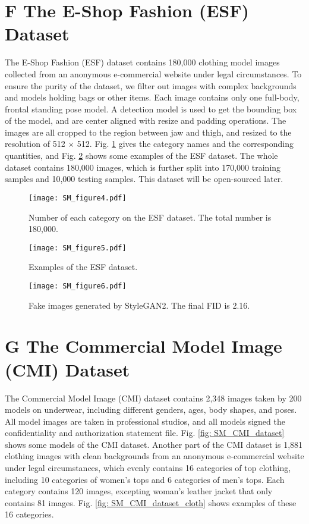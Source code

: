 \documentclass[10pt,twocolumn,letterpaper]{article}
\begin{document}
\section*{F The E-Shop Fashion (ESF) Dataset }
The E-Shop Fashion (ESF) dataset contains 180,000 clothing model images collected from an anonymous e-commercial website under legal circumstances. To ensure the purity of the dataset, we filter out images with complex backgrounds and models holding bags or other items. Each image contains only one full-body, frontal standing pose model.
A detection model is used to get the bounding box of the model, and are center aligned with resize and padding operations. The images are all cropped to the region between jaw and thigh, and resized to the resolution of 512 $\times$ 512. Fig. \ref{fig: SM_sta_cloth} gives the category names and the corresponding quantities, and Fig. \ref{fig: SM_ESF} shows some examples of the ESF dataset. The whole dataset contains 180,000 images, which is further split into 170,000 training samples and 10,000 testing samples. This dataset will be open-sourced later.

\begin{figure}[h]
  \centering
  \texttt{[image: SM\_figure4.pdf]}
  \caption{Number of each category on the ESF dataset. The total number is 180,000.}\label{fig: SM_sta_cloth}
\end{figure}

\begin{figure}[h]
  \centering
  \texttt{[image: SM\_figure5.pdf]}
  \caption{Examples of the ESF dataset.}\label{fig: SM_ESF}
\end{figure}

\begin{figure}[h]
  \centering
  \texttt{[image: SM\_figure6.pdf]}
  \caption{Fake images generated by StyleGAN2. The final FID is 2.16.}\label{fig: SM_fake_img}
\end{figure}


\section*{G The Commercial Model Image (CMI) Dataset}
The Commercial Model Image (CMI) dataset contains 2,348 images taken by 200 models on
underwear, including different genders, ages, body shapes,
and poses. All model images are taken in professional studios, and all models signed the confidentiality and authorization statement file. Fig. \ref{fig: SM_CMI_dataset} shows some models of the CMI dataset.
Another part of the CMI dataset is 1,881 clothing images with clean backgrounds from an anonymous e-commercial website under legal circumstances, which evenly contains 16 categories of top clothing, including 10 categories of women's tops and 6 categories of men's tops. Each category contains 120 images, excepting woman's leather jacket that only contains 81 images. 
Fig. \ref{fig: SM_CMI_dataset_cloth} shows examples of these 16 categories.
\end{document}
